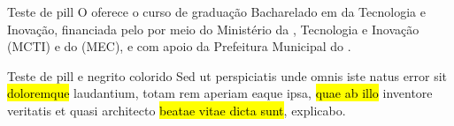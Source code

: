 \documentclass[aspectratio=169]{beamer}
\begin{document}
\begin{frame}{Teste de pill}
  O  oferece o curso de graduação Bacharelado em  da Tecnologia e Inovação, 
  financiada pelo  por meio do Ministério da , Tecnologia e Inovação (MCTI) 
  e do  (MEC), e com apoio da Prefeitura Municipal do .
\end{frame}

\begin{frame}{Teste de pill e negrito colorido}
   Sed ut perspiciatis unde omnis iste natus error sit  
   \hl{doloremque} laudantium, totam rem aperiam eaque ipsa, \hl{quae ab illo} inventore 
   veritatis et quasi architecto \hl{beatae vitae dicta sunt}, explicabo.
\end{frame}
\end{document}
